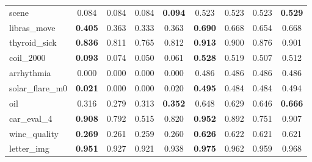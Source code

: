 \begin{figure}[ht]
\begin{tabular}{p{22mm}|*4{p{14mm}}|*4{p{14mm}}}
        scene&\multicolumn{1}{c}{0.084}&\multicolumn{1}{c}{0.084}&\multicolumn{1}{c}{0.084}&\multicolumn{1}{c|}{\textbf{0.094}}&\multicolumn{1}{c}{0.523}&\multicolumn{1}{c}{0.523}&\multicolumn{1}{c}{0.523}&\multicolumn{1}{c}{\textbf{0.529}}\\
        libras\_move&\multicolumn{1}{c}{\textbf{0.405}}&\multicolumn{1}{c}{0.363}&\multicolumn{1}{c}{0.333}&\multicolumn{1}{c|}{0.363}&\multicolumn{1}{c}{\textbf{0.690}}&\multicolumn{1}{c}{0.668}&\multicolumn{1}{c}{0.654}&\multicolumn{1}{c}{0.668}\\
        thyroid\_sick&\multicolumn{1}{c}{\textbf{0.836}}&\multicolumn{1}{c}{0.811}&\multicolumn{1}{c}{0.765}&\multicolumn{1}{c|}{0.812}&\multicolumn{1}{c}{\textbf{0.913}}&\multicolumn{1}{c}{0.900}&\multicolumn{1}{c}{0.876}&\multicolumn{1}{c}{0.901}\\
        coil\_2000&\multicolumn{1}{c}{\textbf{0.093}}&\multicolumn{1}{c}{0.074}&\multicolumn{1}{c}{0.050}&\multicolumn{1}{c|}{0.061}&\multicolumn{1}{c}{\textbf{0.528}}&\multicolumn{1}{c}{0.519}&\multicolumn{1}{c}{0.507}&\multicolumn{1}{c}{0.512}\\
        arrhythmia&\multicolumn{1}{c}{0.000}&\multicolumn{1}{c}{0.000}&\multicolumn{1}{c}{0.000}&\multicolumn{1}{c|}{0.000}&\multicolumn{1}{c}{0.486}&\multicolumn{1}{c}{0.486}&\multicolumn{1}{c}{0.486}&\multicolumn{1}{c}{0.486}\\
        solar\_flare\_m0&\multicolumn{1}{c}{\textbf{0.021}}&\multicolumn{1}{c}{0.000}&\multicolumn{1}{c}{0.000}&\multicolumn{1}{c|}{0.020}&\multicolumn{1}{c}{\textbf{0.495}}&\multicolumn{1}{c}{0.484}&\multicolumn{1}{c}{0.484}&\multicolumn{1}{c}{0.494}\\
        oil&\multicolumn{1}{c}{0.316}&\multicolumn{1}{c}{0.279}&\multicolumn{1}{c}{0.313}&\multicolumn{1}{c|}{\textbf{0.352}}&\multicolumn{1}{c}{0.648}&\multicolumn{1}{c}{0.629}&\multicolumn{1}{c}{0.646}&\multicolumn{1}{c}{\textbf{0.666}}\\
        car\_eval\_4&\multicolumn{1}{c}{\textbf{0.908}}&\multicolumn{1}{c}{0.792}&\multicolumn{1}{c}{0.515}&\multicolumn{1}{c|}{0.820}&\multicolumn{1}{c}{\textbf{0.952}}&\multicolumn{1}{c}{0.892}&\multicolumn{1}{c}{0.751}&\multicolumn{1}{c}{0.907}\\
        wine\_quality&\multicolumn{1}{c}{\textbf{0.269}}&\multicolumn{1}{c}{0.261}&\multicolumn{1}{c}{0.259}&\multicolumn{1}{c|}{0.260}&\multicolumn{1}{c}{\textbf{0.626}}&\multicolumn{1}{c}{0.622}&\multicolumn{1}{c}{0.621}&\multicolumn{1}{c}{0.621}\\
        letter\_img&\multicolumn{1}{c}{\textbf{0.951}}&\multicolumn{1}{c}{0.927}&\multicolumn{1}{c}{0.921}&\multicolumn{1}{c|}{0.938}&\multicolumn{1}{c}{\textbf{0.975}}&\multicolumn{1}{c}{0.962}&\multicolumn{1}{c}{0.959}&\multicolumn{1}{c}{0.968}\\

\end{tabular}
\end{figure}
